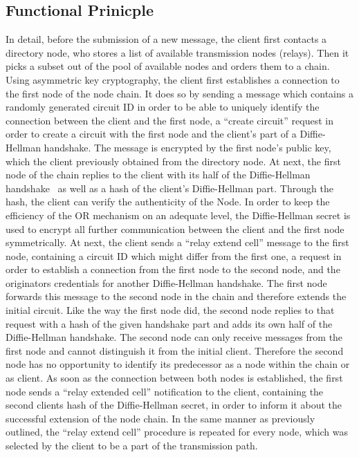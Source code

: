 \documentclass{sig-alternate}
\begin{document}
\subsection{Functional Prinicple}
In detail, before the submission of a new message, the client first contacts a directory node, who stores a list of available transmission nodes (relays).  Then it picks a subset out of the pool of available nodes and orders them to a chain. Using asymmetric key cryptography, the client first establishes a connection to the first node of the node chain. It does so by sending a message which contains a randomly generated circuit ID in order to be able to uniquely identify the connection between the client and the first node, a ``create circuit'' request in order to create a circuit with the first node and the client's part of a Diffie-Hellman handshake. The message is encrypted by the first node's public key, which the client previously obtained from the directory node. At next, the first node of the chain replies to the client with its half of the Diffie-Hellman handshake~\cite{diffie1976new} as well as a hash of the client's Diffie-Hellman part. Through the hash, the client can verify the authenticity of the Node. In order to keep the efficiency of the OR mechanism on an adequate level, the Diffie-Hellman secret is used to encrypt all further communication between the client and the first node symmetrically. At next, the client sends a ``relay extend cell'' message to the first node, containing a circuit ID which might differ from the first one, a request in order to establish a connection from the first node to the second node, and the originators credentials for another Diffie-Hellman handshake. The first node forwards this message to the second node in the chain and therefore extends the initial circuit. Like the way the first node did, the second node replies to that request with a hash of the given handshake part and adds its own half of the Diffie-Hellman handshake. The second node can only receive messages from the first node and cannot distinguish it from the initial client. Therefore the second node has no opportunity to identify its predecessor as a node within the chain or as client. As soon as the connection between both nodes is established, the first node sends a ``relay extended cell'' notification to the client, containing the second clients hash of the Diffie-Hellman secret, in order to inform it about the successful extension of the node chain. In the same manner as previously outlined, the ``relay extend cell'' procedure is repeated for every node, which was selected by the client to be a part of the transmission path. 
\end{document}
